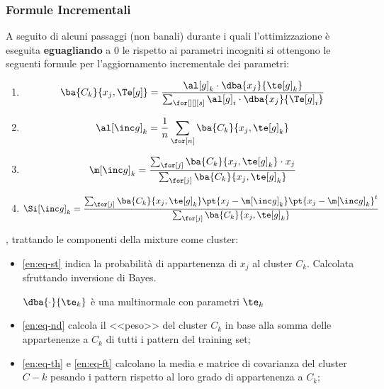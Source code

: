 \subsubsection{Formule Incrementali}\label{sec:formule_incrementali} %
A seguito di alcuni passaggi (non banali) durante i quali l'ottimizzazione è eseguita \textbf{eguagliando} a $0$ le  rispetto ai parametri incogniti si ottengono le seguenti formule per l'aggiornamento incrementale dei parametri:
\begin{enumerate}[ref=\textbf{(\arabic*)}]
    \item \label{en:eq-st} \[
            \ba{C_k}{x_j,\Te[g]} = \frac{\al[g]_k \cdot \dba{x_j}{\te[g]_k}}{\sum_{\for[][][s]}\al[g]_i\cdot \dba{x_j}{\Te[g]_i}}
        \]
    \item \label{en:eq-nd} \[
            \al[\inc g]_k = \frac{1}{n} \sum_{\for[n]}\ba{C_k}{x_j,\te[g]_k}
        \]
    \item \label{en:eq-th} \[
            \m[\inc g]_k = \frac{\sum_{\for[j]}\ba{C_k}{x_j,\te[g]_k} \cdot x_j}{\sum_{\for[j]}\ba{C_k}{x_j,\te[g]_k}}
        \]
    \item \label{en:eq-ft} \[
            \Si[\inc g]_k = \frac{\sum_{\for[j]}\ba{C_k}{x_j,\te[g]_k} \pt{x_j-\m[\inc g]_k} \pt{x_j-\m[\inc g]_k}^t}{\sum_{\for[j]}\ba{C_k}{x_j,\te[g]_k}}
        \]
\end{enumerate}
, trattando le componenti della mixture come cluster:
\begin{itemize}
    \item \ref{en:eq-st} indica la probabilità di appartenenza di $x_j$ al cluster $C_k$.
        Calcolata sfruttando inversione di Bayes.
        \begin{note}
            $\dba{\cdot}{\te_k}$ è una multinormale con parametri $\te_k$
        \end{note}
    \item \ref{en:eq-nd} calcola il <<peso>> del cluster $C_k$ in base alla somma delle appartenenze a $C_k$ di tutti i pattern del training set;
    \item \ref{en:eq-th} e \ref{en:eq-ft} calcolano la media e matrice di covarianza del cluster $C-k$ pesando i pattern rispetto al loro grado di appartenenza a $C_k$;
\end{itemize}
%
